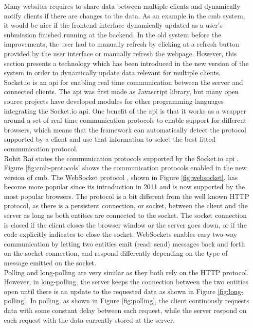 Many websites requires to share data between multiple clients and dynamically notify clients if there are changes to the data. As an example in the \gls{cmb} system, it would be nice if the frontend interface dynamically updated as a user's submission finished running at the backend. In the old system before the improvements, the user had to manually refresh by clicking at a refresh button provided by the user interface or manually refresh the webpage. However, this section presents a technology which has been introduced in the new version of the system in order to dynamically update data relevant for multiple clients. \\

Socket.io \cite{SOCKETIO} is an \gls{api} for enabling real time communication between the server and connected clients. The \gls{api} was first made as Javascript library, but many open source projects have developed modules for other programming languages integrating the Socket.io \gls{api}. One benefit of the \gls{api} is that it works as a wrapper around a set of real time communication protocols to enable support for different browsers, which means that the framework can automatically detect the protocol supported by a client and use that information to select the best fitted communication protocol. \\

Rohit Rai states the communication protocols supported by the Socket.io \gls{api} \cite{Rai2013}. Figure \ref{fig:cmb-protocols} shows the communication protocols enabled in the new version of \gls{cmb}. The WebSocket protocol \cite{a:Fette2011}, shown in Figure \ref{fig:websocket}, has become more popular since its introduction in 2011 and is now supported by the most popular browsers. The protocol is a bit different from the well known HTTP protocol, as there is a persistent connection, or socket, between the client and the server as long as both entities are connected to the socket. The socket connection is closed if the client closes the browser window or the server goes down, or if the code explicitly indicates to close the socket. WebSockets enables easy two-way communication by letting two entities emit (read: send) messages back and forth on the socket connection, and respond differently depending on the type of message emitted on the socket. \\

Polling and long-polling are very similar as they both rely on the HTTP protocol. However, in long-polling, the server keeps the connection between the two entities open until there is an update to the requested data as shown in Figure \ref{fig:long-polling}. In polling, as shown in Figure \ref{fig:polling}, the client continously requests data with some constant delay between each request, while the server respond on each request with the data currently stored at the server. \\

